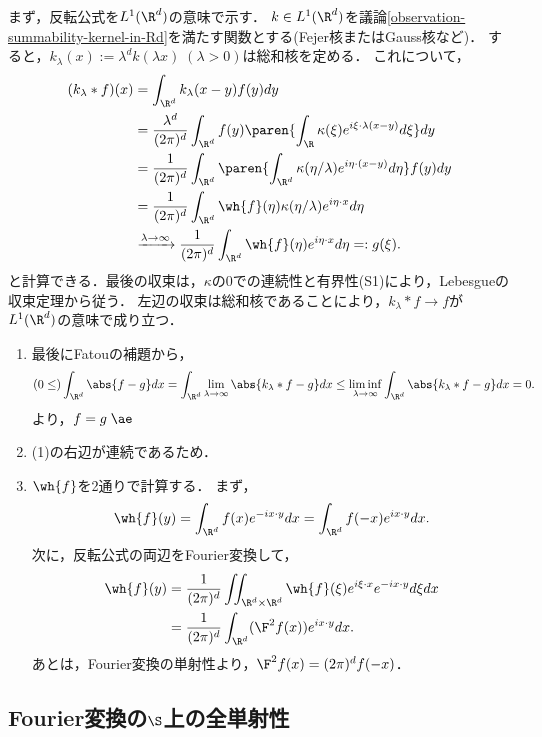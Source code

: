 \documentclass[uplatex,dvipdfmx]{jsreport}
\begin{document}
\begin{Proof}
    まず，反転公式を$L^1(\R^d)$の意味で示す．
    $k\in L^1(\R^d)$を議論\ref{observation-summability-kernel-in-Rd}を満たす関数とする(Fejer核またはGauss核など)．
    すると，$k_\lambda(x):=\lambda^dk(\lambda x)\;(\lambda>0)$は総和核を定める．
    これについて，
    \begin{align*}
        (k_\lambda *f)(x)&=\int_{\R^d}k_\lambda(x-y)f(y)dy\\
        &=\frac{\lambda^d}{(2\pi)^d}\int_{\R^d}f(y)\paren{\int_{\R}\kappa(\xi)e^{i\xi\cdot\lambda(x-y)}d\xi}dy\\
        &=\frac{1}{(2\pi)^d}\int_{\R^d}\paren{\int_{\R^d}\kappa(\eta/\lambda)e^{i\eta\cdot(x-y)}d\eta}f(y)dy\\
        &=\frac{1}{(2\pi)^d}\int_{\R^d}\wh{f}(\eta)\kappa(\eta/\lambda)e^{i\eta\cdot x}d\eta\\
        &\xrightarrow{\lambda\to\infty}\frac{1}{(2\pi)^d}\int_{\R^d}\wh{f}(\eta)e^{i\eta\cdot x}d\eta=:g(\xi).
    \end{align*}
    と計算できる．最後の収束は，$\kappa$の$0$での連続性と有界性(S1)により，Lebesgueの収束定理から従う．
    左辺の収束は総和核であることにより，$k_\lambda*f\to f$が$L^1(\R^d)$の意味で成り立つ．
    \begin{enumerate}
        \item 最後にFatouの補題から，
        \[(0\le)\int_{\R^d}\abs{f-g}dx=\int_{\R^d}\lim_{\lambda\to\infty}\abs{k_\lambda*f-g}dx\le\liminf_{\lambda\to\infty}\int_{\R^d}\abs{k_\lambda*f-g}dx=0.\]
        より，$f=g\;\ae$
        \item (1)の右辺が連続であるため．
        \item $\wh{f}$を2通りで計算する．
        まず，
        \[\wh{f}(y)=\int_{\R^d}f(x)e^{-ix\cdot y}dx=\int_{\R^d}f(-x)e^{ix\cdot y}dx.\]
        次に，反転公式の両辺をFourier変換して，
        \begin{align*}
            \wh{f}(y)&=\frac{1}{(2\pi)^d}\iint_{\R^d\times\R^d}\wh{f}(\xi)e^{i\xi\cdot x}e^{-ix\cdot y}d\xi dx\\
            &=\frac{1}{(2\pi)^d}\int_{\R^d}(\F^2f(x))e^{ix\cdot y}dx.
        \end{align*}
        あとは，Fourier変換の単射性より，$\F^2f(x)=(2\pi)^df(-x)$．
    \end{enumerate}
\end{Proof}

\subsection{Fourier変換の$\S$上の全単射性}
\end{document}
